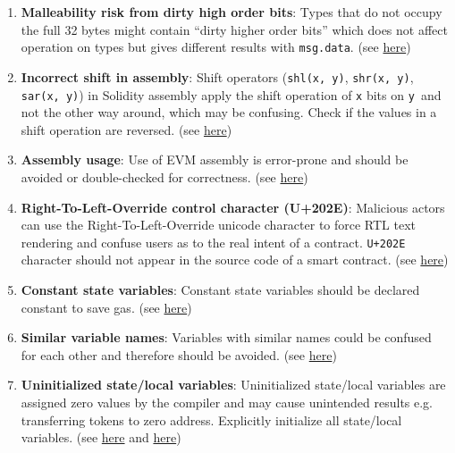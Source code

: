 \begin{enumerate}
\item\textbf{Malleability risk from dirty high order bits}: Types that do not occupy the full 32 bytes might contain “dirty higher order bits” which does not affect operation on types but gives different results with \verb|msg.data|. (see \href{https://docs.soliditylang.org/en/v0.8.1/security-considerations.html\#minor-details}{here})

\item\textbf{Incorrect shift in assembly}: Shift operators (\verb|shl(x, y)|, \verb|shr(x, y)|, \verb|sar(x, y)|) in Solidity assembly apply the shift operation of \verb|x| bits on \verb|y |and not the other way around, which may be confusing. Check if the values in a shift operation are reversed. (see \href{https://github.com/crytic/slither/wiki/Detector-Documentation\#incorrect-shift-in-assembly}{here})

\item\textbf{Assembly usage}: Use of EVM assembly is error-prone and should be avoided or double-checked for correctness. (see \href{https://github.com/crytic/slither/wiki/Detector-Documentation\#assembly-usage}{here})

\item\textbf{Right-To-Left-Override control character (U+202E)}: Malicious actors can use the Right-To-Left-Override unicode character to force RTL text rendering and confuse users as to the real intent of a contract. \verb|U+202E| character should not appear in the source code of a smart contract. (see \href{https://swcregistry.io/docs/SWC-130}{here})

\item\textbf{Constant state variables}: Constant state variables should be declared constant to save gas. (see \href{https://github.com/crytic/slither/wiki/Detector-Documentation\#state-variables-that-could-be-declared-constant}{here})

\item\textbf{Similar variable names}: Variables with similar names could be confused for each other and therefore should be avoided. (see \href{https://github.com/crytic/slither/wiki/Detector-Documentation\#variable-names-too-similar}{here})

\item\textbf{Uninitialized state/local variables}: Uninitialized state/local variables are assigned zero values by the compiler and may cause unintended results e.g. transferring tokens to zero address. Explicitly initialize all state/local variables. (see \href{https://github.com/crytic/slither/wiki/Detector-Documentation\#uninitialized-state-variables}{here} and \href{https://github.com/crytic/slither/wiki/Detector-Documentation\#uninitialized-local-variables}{here})


\end{enumerate}
